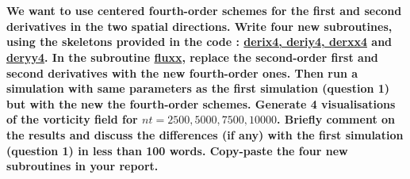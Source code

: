 \documentclass[10pt, a4paper]{article}
\begin{document}
\section{}
\textbf{We want to use centered fourth-order schemes for the first and second derivatives in the two spatial directions. Write four new subroutines, using the skeletons provided in the code : \url{derix4, deriy4, derxx4} and \url{deryy4}. In the subroutine \url{fluxx}, replace the second-order first and second derivatives with the new fourth-order ones. Then run a simulation with same parameters as the first simulation (question 1) but with the new the fourth-order schemes. Generate 4 visualisations of the vorticity field for $nt = 2500, 5000, 7500, 10000$. Briefly comment on the results and discuss the differences (if any) with the first simulation (question 1) in less than 100 words. Copy-paste the four new subroutines in your report.}
\end{document}
